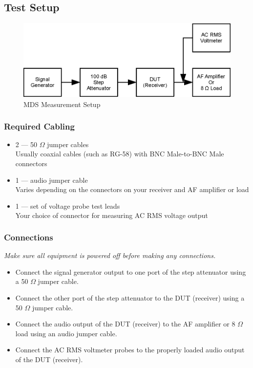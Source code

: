 \documentclass[10pt,letterpaper]{book}
\begin{document}
\subsection*{Test Setup}
\begin{figure}
\centering
\includegraphics[scale=1]{Illustrations/MDSSetup}
\caption{MDS Measurement Setup}
\end{figure}
\subsubsection*{Required Cabling}
\begin{itemize}
	\item 2 --- 50 $\Omega$ jumper cables \\
		Usually coaxial cables (such as RG-58) with BNC Male-to-BNC Male connectors
	\item 1 --- audio jumper cable \\
		Varies depending on the connectors on your receiver and AF amplifier or load
	\item 1 --- set of voltage probe test leads \\
		Your choice of connector for measuring AC RMS voltage output
\end{itemize}
\subsubsection*{Connections}
\emph{Make sure all equipment is powered off before making any connections.}
\begin{itemize}
	\item Connect the signal generator output to one port of the step attenuator using a 50 $\Omega$ jumper cable.
	\item Connect the other port of the step attenuator to the DUT (receiver) using a 50 $\Omega$ jumper cable.
	\item Connect the audio output of the DUT (receiver) to the AF amplifier or 8 $\Omega$ load using an audio jumper cable.
	\item Connect the AC RMS voltmeter probes to the properly loaded audio output of the DUT (receiver).
\end{itemize}
\end{document}
